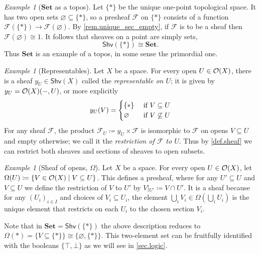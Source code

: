 \documentclass[11pt, oneside, article]{memoir}
\theoremstyle{plain}
\theoremstyle{definition}
\theoremstyle{remark}
\newtheorem{example}[theorem]{Example}
\renewcommand{\ss}{\subseteq}
\newcommand{\Cat}[1]{\mathbf{#1}}
\newcommand{\fun}[1]{\mathcal{#1}}
\newcommand{\Fun}[1]{\mathsf{#1}}
\newcommand{\sheaf}[1]{\fun{#1}}
\newcommand{\smset}{\Cat{Set}}
\newcommand{\tn}[1]{\textnormal{#1}}
\newcommand{\shv}{\Fun{Shv}}
\newcommand{\Op}[1][undef]{\ifthenelse{\equal{#1}{undef}}{\mathcal{O}}{\mathcal{O}(#1)}}
\newcommand{\rest}[2]{#1\big|\hspace{0in}_{#2}}
\newcommand{\true}{\top}
\newcommand{\false}{\bot}
\begin{document}
\begin{example}[$\smset$ as a topos]\label{ex.set_topos}
Let $\{*\}$ be the unique one-point topological space. It has two open sets $\varnothing\ss\{*\}$, so a presheaf $\sheaf{F}$ on $\{*\}$ consists of a function $\sheaf{F}(\{*\})\to\sheaf{F}(\varnothing)$. By \cref{rem.unique_sec_empty}, if $\sheaf{F}$ is to be a sheaf then $\sheaf{F}(\varnothing)\cong 1$. It follows that sheaves on a point are simply sets,
\[
\shv(\{*\})\cong\smset.
\]
Thus $\smset$ is an example of a topos, in some sense the primordial one.
\end{example}

\begin{example}[Representables]\label{ex.representable_sheaf}
Let $X$ be a space. For every open $U\in\Op[X]$, there is a sheaf $y_U\in\shv(X)$ called the \emph{representable on $U$}; it is given by $y_U=\Op[X](-,U)$, or more explicitly
\[
	y_U(V)=
	\begin{cases}
	\{*\}&\tn{ if }V\ss U\\
	\varnothing&\tn{ if }V\not\ss U
	\end{cases}
\]
For any sheaf $\sheaf{F}$, the product $\sheaf{F}_U\coloneqq y_U\times\sheaf{F}$ is isomorphic to $\sheaf{F}$ on opens $V\ss U$ and empty otherwise; we call it the \emph{restriction of $\sheaf{F}$ to $U$}. Thus by \cref{def.sheaf} we can restrict both sheaves and sections of sheaves to open subsets.
\end{example}

\begin{example}[Sheaf of opens, $\Omega$]\label{ex.subobject_classifier}
Let $X$ be a space. For every open $U\in\Op[X]$, let $\Omega(U)\coloneqq\{V\in\Op[X]\mid V\ss U\}$. This defines a presheaf, where for any $U'\ss U$ and $V\ss U$ we define the restriction of $V$ to $U'$ by $\rest{V}{U'}\coloneqq V\cap U'$. It is a sheaf because for any $(U_i)_{i\in I}$ and choices of $V_i\ss U_i$, the element $\bigcup_iV_i\in\Omega(\bigcup_i U_i)$ is the unique element that restricts on each $U_i$ to the chosen section $V_i$.

Note that in $\smset=\shv(\{*\})$ the above description reduces to $\Omega(*)=\{V\ss\{*\}\}\cong\{\varnothing,\{*\}\}$. This two-element set can be fruitfully identified with the booleans $\{\true,\false\}$ as we will see in \cref{sec.logic}.
\end{example}
\end{document}
